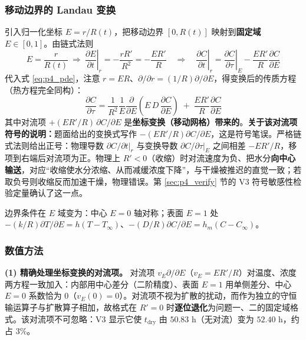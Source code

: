 \subsubsection{移动边界的 Landau 变换}

引入归一化坐标 $E=r/R(t)$，把移动边界 $[0,R(t)]$ 映射到\textbf{固定域} $E\in[0,1]$。由链式法则
\begin{equation}
  E=\frac{r}{R(t)}\ \Rightarrow\
  \left.\frac{\partial E}{\partial t}\right|_r=-\frac{rR'}{R^2}=-\frac{ER'}{R}
  \quad\Longrightarrow\quad
  \left.\frac{\partial C}{\partial t}\right|_r=\left.\frac{\partial C}{\partial \tau}\right|_E-\frac{ER'}{R}\frac{\partial C}{\partial E}
  \label{eq:p4_chain}
\end{equation}
代入式 \eqref{eq:p4_pde}，注意 $r=ER$、$\partial/\partial r=(1/R)\partial/\partial E$，得变换后的传质方程（热方程完全同构）：
\begin{equation}
  \frac{\partial C}{\partial \tau}=\frac{1}{R^2}\frac{1}{E}\frac{\partial}{\partial E}\left(E\,D\,\frac{\partial C}{\partial E}\right)\;+\;\frac{E R'}{R}\frac{\partial C}{\partial E}
  \label{eq:p4_transformed}
\end{equation}
其中对流项 $+(E R'/R)\,\partial C/\partial E$ 是\textbf{坐标变换（移动网格）带来的}。\textbf{关于该对流项符号的说明：}题面给出的变换式写作 $-(E R'/R)\partial C/\partial E$，这是符号笔误。严格链式法则给出正号：物理导数 $\partial C/\partial t|_r$ 与变换导数 $\partial C/\partial\tau|_E$ 之间相差 $-ER'/R$，移项到右端后对流项为正。物理上 $R'<0$（收缩）时对流速度为负、把水分\textbf{向中心输送}，对应“收缩使水分浓缩、从而减缓浓度下降”，与干燥被推迟的直觉一致；若取负号则收缩反而加速干燥，物理错误。第 \ref{sec:p4_verify} 节的 V3 符号敏感性检验定量确认了这一点。

边界条件在 $E$ 域变为：中心 $E=0$ 轴对称；表面 $E=1$ 处 $-(k/R)\partial T/\partial E=h(T-T_\infty)$、$-(D/R)\partial C/\partial E=h_m(C-C_\infty)$。

\subsubsection{数值方法}

\textbf{(1) 精确处理坐标变换的对流项。} 对流项 $v_E\partial/\partial E$（$v_E=E R'/R$）对温度、浓度两方程一致加入：内部用中心差分（二阶精度）、表面 $E=1$ 用单侧差分、中心 $E=0$ 系数恰为 $0$（$v_E(0)=0$）。对流项不视为扩散的扰动，而作为独立的守恒输运算子与扩散算子相加，故格式在 $R'=0$ 时\textbf{逐位退化}为问题一、二的固定域格式。该对流项不可忽略：V3 显示它使 $t_{\text{dry}}$ 由 $50.83$ h（无对流）变为 $52.40$ h，约占 $3\%$。

